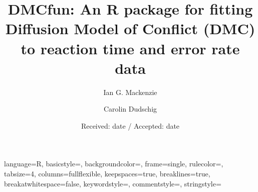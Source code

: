 \newenvironment{knitrout}{}{} %

\usepackage{alltt}  %

\usepackage{tempora}  %
\usepackage{graphicx}
\usepackage{color}
\usepackage{float}
\usepackage{listings}
\usepackage{longtable}
\usepackage[style=apa, sortcites=true, sorting=nyt,backend=biber]{biblatex}





{
  language=R,
  basicstyle=\small\ttfamily,
  backgroundcolor=\color{white},
  frame=single,
  rulecolor=\color{black},
  tabsize=4,
  columns=fullflexible,
  keepspaces=true,
  breaklines=true,
  breakatwhitespace=false,
  keywordstyle=\color{black},
  commentstyle=\color{dkgreen},
  stringstyle=\color{black}
}


\title{DMCfun: An R package for fitting Diffusion Model of Conflict (DMC) to reaction time and error rate data}
\subtitle{}

\author{Ian G. Mackenzie \and
    Carolin Dudschig
}


\date{Received: date / Accepted: date}
\maketitle

